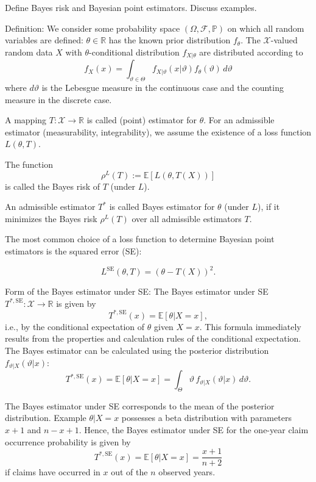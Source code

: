 Define Bayes risk and Bayesian point estimators. Discuss examples.

Definition:
We consider some probability space \((\Omega, \mathcal{F}, \mathbb{P})\) on which all random variables are defined:
\(\theta \in \mathbb{R}\) has the known prior distribution \(f_\theta\).
The \(\mathcal{X}\)-valued random data \(X\) with \(\theta\)-conditional distribution \(f_{X|\theta}\) are distributed according to
\[
f_X(x) = \int_{\vartheta \in \Theta} f_{X|\vartheta}(x|\vartheta)f_\theta(\vartheta) \, d\vartheta
\]
where \(d\vartheta\) is the Lebesgue measure in the continuous case and the counting measure in the discrete case.
  
A mapping \(T : \mathcal{X} \to \mathbb{R}\) is called (point) estimator for \(\theta\).
For an admissible estimator (measurability, integrability), we assume the existence of a loss function \(L(\theta, T)\).

The function
\[
\rho^L(T) := \mathbb{E}[L(\theta, T(X))]
\]
is called the Bayes risk of \(T\) (under \(L\)).

An admissible estimator \(T^*\) is called Bayes estimator for \(\theta\) (under \(L\)), 
if it minimizes the Bayes risk \(\rho^L(T)\) over all admissible estimators \(T\).

The most common choice of a loss function to determine Bayesian point estimators is the squared error (SE):

\[
L^{\text{SE}}(\theta, T) = (\theta - T(X))^2.
\]

Form of the Bayes estimator under SE:
The Bayes estimator under SE \(T^{*,\text{SE}} : \mathcal{X} \to \mathbb{R}\) is given by
\[
T^{*,\text{SE}}(x) = \mathbb{E}[\theta|X = x],
\]
i.e., by the conditional expectation of \(\theta\) given \(X = x\).
This formula immediately results from the properties and calculation rules of the conditional expectation.
The Bayes estimator can be calculated using the posterior distribution \(f_{\vartheta|X}(\vartheta|x)\):
\[
T^{*,\text{SE}}(x) = \mathbb{E}[\theta|X = x] = \int_\Theta \vartheta \, f_{\vartheta|X}(\vartheta|x) \, d\vartheta.
\]

The Bayes estimator under SE corresponds to the mean of the posterior distribution.
Example
\(\theta|X = x\) possesses a beta distribution with parameters \(x + 1\) and \(n - x + 1\). 
Hence, the Bayes estimator under SE for the one-year claim occurrence probability is given by
\[
T^{*,\text{SE}}(x) = \mathbb{E}[\theta|X = x] = \frac{x+1}{n+2}
\]
if claims have occurred in \(x\) out of the \(n\) observed years.



